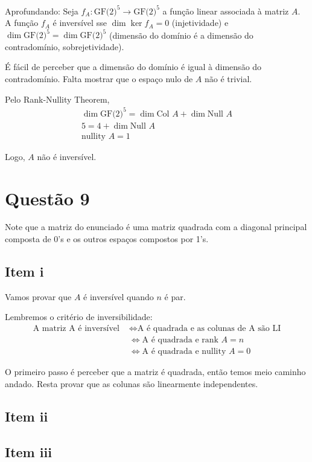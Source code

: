 \documentclass{article}
\newcommand{\Null}[1]{\textrm{Null } #1}
\newcommand{\Col}[1]{\textrm{Col } #1}
\newcommand{\nullity}[1]{\textrm{nullity } #1}
\newcommand{\rank}[1]{\textrm{rank } #1}
\begin{document}
\medskip
Aprofundando: Seja $f_A: \textrm{GF(2)}^5 \to \textrm{GF(2)}^5$ a função linear associada à matriz $A$.
A função $f_A$ é inversível sse $\dim \ker f_A = 0$ (injetividade) e $\dim \textrm{GF(2)}^5 = \dim \textrm{GF(2)}^5$ (dimensão do domínio é a dimensão do contradomínio, sobrejetividade).

É fácil de perceber que a dimensão do domínio é igual à dimensão do contradomínio. Falta mostrar que o espaço nulo de $A$ não é trivial.

Pelo Rank-Nullity Theorem, 
\begin{align*}
    \dim \textrm{GF(2)}^5 = \dim \Col{A} + \dim \Null{A}\\
    5 = 4 + \dim \Null{A}\\
    \nullity{A} = 1
\end{align*}

Logo, $A$ não é inversível.



\section*{Questão 9}
Note que a matriz do enunciado é uma matriz quadrada com a diagonal principal composta de 0's e os outros espaços compostos por 1's.

\subsection*{Item i}
Vamos provar que $A$ é inversível quando $n$ é par.

Lembremos o critério de inversibilidade:
\begin{align*}
    \textrm{A matriz A é inversível } &\iff \textrm{A é quadrada e as colunas de A são LI} \\
    &\iff \textrm{A é quadrada e } \rank{A} = n \\
    &\iff \textrm{A é quadrada e } \nullity{A} = 0
\end{align*}



\medskip

O primeiro passo é perceber que a matriz é quadrada, então temos meio caminho andado.
Resta provar que as colunas são linearmente independentes.




\subsection*{Item ii}
\subsection*{Item iii}
\end{document}
